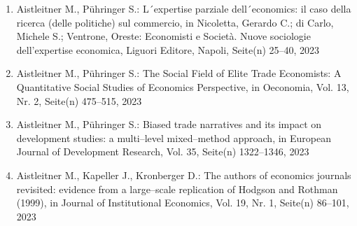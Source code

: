 \begin{enumerate}
	 \item Aistleitner M., Pühringer S.: L´expertise parziale dell´economics: il caso della ricerca (delle politiche) sul commercio, in Nicoletta, Gerardo C.; di Carlo, Michele S.; Ventrone, Oreste: Economisti e Società. Nuove sociologie dell'expertise economica, Liguori Editore, Napoli, Seite(n) 25--40, 2023
	 \item Aistleitner M., Pühringer S.: The Social Field of Elite Trade Economists: A Quantitative Social Studies of Economics Perspective, in Oeconomia, Vol. 13, Nr. 2, Seite(n) 475--515, 2023
	 \item Aistleitner M., Pühringer S.: Biased trade narratives and its impact on development studies: a multi--level mixed--method approach, in European Journal of Development Research, Vol. 35, Seite(n) 1322--1346, 2023
	 \item Aistleitner M., Kapeller J., Kronberger D.: The authors of economics journals revisited: evidence from a large--scale replication of Hodgson and Rothman (1999), in Journal of Institutional Economics, Vol. 19, Nr. 1, Seite(n) 86–101, 2023
\end{enumerate}
